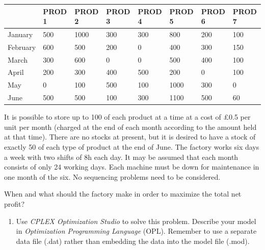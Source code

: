 \documentclass[12pt,a4paper]{article}
\theoremstyle{definition}
\begin{document}
\begin{enumerate}
    \begin{table}[htbp]
      \scriptsize
      \centering
      \renewcommand\arraystretch{1.1}
      \begin{tabular}{m{} m{}<{\centering} m{}<{\centering} m{}<{\centering} m{}<{\centering} m{}<{\centering} m{}<{\centering} m{}<{\centering}}
      \hline
       & \textbf{PROD 1} & \textbf{PROD 2} & \textbf{PROD 3} & \textbf{PROD 4} & \textbf{PROD 5} & \textbf{PROD 6} &  \textbf{PROD 7} \\\hline
      January & 500 & 1000 & 300 & 300 & 800 & 200 & 100 \\
      February & 600 & 500 & 200 & 0 & 400 & 300 & 150 \\
      March & 300 & 600 & 0 & 0 & 500 & 400 & 100 \\
      April & 200 & 300 & 400 & 500 & 200 & 0 & 100 \\
      May & 0 & 100 & 500 & 100 & 1000 & 300 & 0 \\
      June & 500 & 500 & 100 & 300 & 1100 & 500 & 60 \\
      \hline
      \end{tabular}
    \end{table}

    It is possible to store up to 100 of each product at a time at a cost of \pounds0.5 per unit per month (charged at the end of each month according to the amount held at that time). There are no stocks at present, but it is desired to have a stock of exactly 50 of each type of product at the end of June. The factory works six days a week with two shifts of 8h each day. It may be assumed that each month consists of only 24 working days. Each machine must be down for maintenance in one month of the six. No sequencing problems need to be considered.

    When and what should the factory make in order to maximize the total net profit?

    \begin{enumerate}
    \item
    Use \emph{CPLEX Optimization Studio} to solve this problem. Describe your model in \emph{Optimization Programming Language} (OPL). Remember to use a separate data file (.dat) rather than embedding the data into the model file (.mod).


\end{enumerate}
\end{enumerate}
\end{document}
